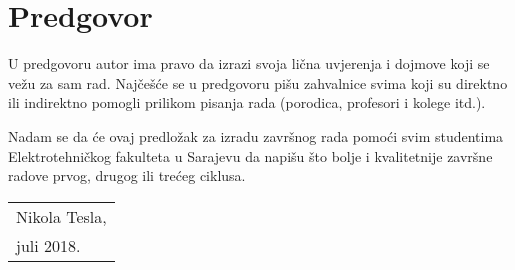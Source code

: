 
\chapter*{Predgovor}

U predgovoru autor ima pravo da izrazi svoja lična uvjerenja i dojmove koji se vežu za sam rad. Najčešće se u predgovoru pišu zahvalnice svima koji su direktno ili indirektno pomogli prilikom pisanja rada (porodica, profesori i kolege itd.). 

Nadam se da će ovaj predložak za izradu završnog rada pomoći svim studentima Elektrotehničkog fakulteta u Sarajevu da napišu što bolje i kvalitetnije završne radove prvog, drugog ili trećeg ciklusa.

\vspace{1cm}
\begin{flushright}
\begin{tabular}{m{6cm}}
Nikola Tesla,\\
juli 2018.
\end{tabular}
\end{flushright}

